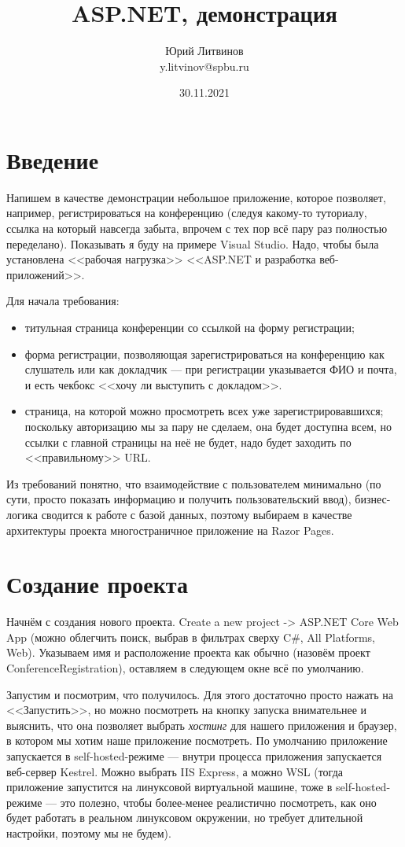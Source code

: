 \documentclass[a5paper]{article}
\title{ASP.NET, демонстрация}
\author{Юрий Литвинов\\\small{y.litvinov@spbu.ru}}
\date{30.11.2021}
\begin{document}
\maketitle
\thispagestyle{empty}

\section{Введение}

Напишем в качестве демонстрации небольшое приложение, которое позволяет, например, регистрироваться на конференцию (следуя какому-то туториалу, ссылка на который навсегда забыта, впрочем с тех пор всё пару раз полностью переделано). Показывать я буду на примере Visual Studio. Надо, чтобы была установлена <<рабочая нагрузка>> <<ASP.NET и разработка веб-приложений>>.

Для начала требования:

\begin{itemize}
    \item титульная страница конференции со ссылкой на форму регистрации;
    \item форма регистрации, позволяющая зарегистрироваться на конференцию как слушатель или как докладчик --- при регистрации указывается ФИО и почта, и есть чекбокс <<хочу ли выступить с докладом>>.
    \item страница, на которой можно просмотреть всех уже зарегистрировавшихся; поскольку авторизацию мы за пару не сделаем, она будет доступна всем, но ссылки с главной страницы на неё не будет, надо будет заходить по <<правильному>> URL.
\end{itemize}

Из требований понятно, что взаимодействие с пользователем минимально (по сути, просто показать информацию и получить пользовательский ввод), бизнес-логика сводится к работе с базой данных, поэтому выбираем в качестве архитектуры проекта многостраничное приложение на Razor Pages.

\section{Создание проекта}

Начнём с создания нового проекта. Create a new project -> ASP.NET Core Web App (можно облегчить поиск, выбрав в фильтрах сверху C\#, All Platforms, Web). Указываем имя и расположение проекта как обычно (назовём проект ConferenceRegistration), оставляем в следующем окне всё по умолчанию.

Запустим и посмотрим, что получилось. Для этого достаточно просто нажать на <<Запустить>>, но можно посмотреть на кнопку запуска внимательнее и выяснить, что она позволяет выбрать \textit{хостинг} для нашего приложения и браузер, в котором мы хотим наше приложение посмотреть. По умолчанию приложение запускается в self-hosted-режиме --- внутри процесса приложения запускается веб-сервер Kestrel. Можно выбрать IIS Express, а можно WSL (тогда приложение запустится на линуксовой виртуальной машине, тоже в self-hosted-режиме --- это полезно, чтобы более-менее реалистично посмотреть, как оно будет работать в реальном линуксовом окружении, но требует длительной настройки, поэтому мы не будем). 
\end{document}
